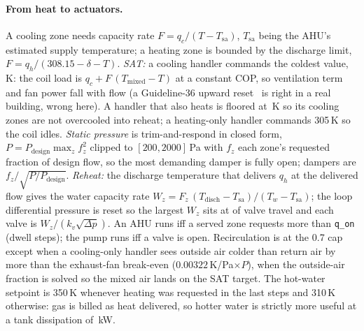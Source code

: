 \documentclass{article}
\begin{document}
\paragraph{From heat to actuators.}
A cooling zone needs capacity rate $F = q_c/(T - T_{\text{sa}})$, $T_{\text{sa}}$ being the
AHU's estimated supply temperature; a heating zone is bounded by the discharge limit, $F =
q_h/(308.15 - \delta - T)$. \emph{SAT:} a cooling handler commands the coldest value,
\ParSatCoolHi\,K: the coil load is $q_c + F\,(T_{\text{mixed}} - T)$ at a constant COP, so ventilation
term and fan power fall with flow (a Guideline-36 upward reset~\citep{ashrae2021g36,taylor2018vav} is
right in a real building, wrong here). A handler
that also heats is floored at \ParSatMixFloor\,K so its cooling zones are not overcooled into
reheat; a heating-only handler commands 305\,K so the coil idles. \emph{Static pressure} is
trim-and-respond in closed form, $P = P_{\text{design}}\max_z f_z^2$ clipped to
$[200, 2000]$\,Pa with $f_z$ each zone's requested fraction of design flow, so the most
demanding damper is fully open; dampers are $f_z/\sqrt{P/P_{\text{design}}}$. \emph{Reheat:} the discharge temperature that delivers $q_h$
at the delivered flow gives the water capacity rate $W_z = F_z\,(T_{\text{disch}} -
T_{\text{sa}})/(T_w - T_{\text{sa}})$; the loop differential pressure is reset so the largest
$W_z$ sits at \ParValveTarget{} of valve travel and each valve is $W_z/(k_v \sqrt{\Delta p})$.
An AHU runs iff a served zone requests more than \texttt{q\_on} (dwell \ParMinOnSteps{}
steps); the pump runs iff a valve is open. Recirculation is at the 0.7 cap except when a
cooling-only handler sees outside air colder than return air by more than the exhaust-fan
break-even ($0.00322$\,K/Pa$\times P$), when the outside-air fraction is solved so the mixed
air lands on the SAT target. The hot-water setpoint is 350\,K whenever heating was requested
in the last \ParHeatSeasonSteps{} steps and 310\,K otherwise: gas is billed as heat delivered,
so hotter water is strictly more useful at a tank dissipation of \TankLossExtraKw\,kW.
\end{document}
